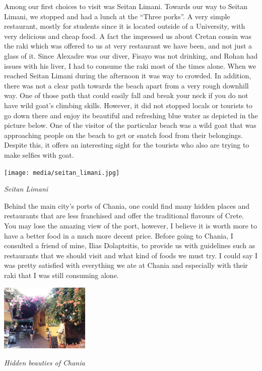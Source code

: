 \documentclass[10pt,a4paper]{article} %
\begin{document}
\begin{multicols}{3}
Among our first choices to visit was Seitan Limani. 
Towards our way to Seitan Limani, we stopped and had a lunch at the 
``Three porks''. 
A very simple restaurant, mostly for students since it is located outside 
of a University, with very delicious and cheap food. 
A fact the impressed us about Cretan cousin was the raki which was offered to us 
at very restaurant we have been, and not just a glass of it. 
Since Alexadre was our diver, Fisayo was not drinking, and Rohan had issues with his 
liver, I had to consume the raki most of the times alone. 
When we reached Seitan Limani during the afternoon it was way to crowded. 
In addition, there was not a clear path towards the beach apart from a very 
rough downhill way. 
One of those path that could easily fall and break your neck if you do not have 
wild goat's climbing skills. 
However, it did not stopped locals or tourists to go down there and enjoy its 
beautiful and refreshing blue water as depicted in the picture below. 
One of the visitor of the particular beach was a wild goat that was approaching 
people on the beach to get or snatch food from their belongings. 
Despite this, it offers an interesting sight for the tourists who also are trying 
to make selfies with goat.   

 
\begin{center}
	\texttt{[image: media/seitan\_limani.jpg]}
	\par\textit{Seitan Limani}
\end{center}



Behind the main city's ports of Chania, one could find many hidden places and 
restaurants that are less franchised and offer the traditional flavours of 
Crete. 
You may lose the amazing view of the port, however, I believe it is worth more 
to have a better food in a much more decent price. 
Before going to Chania, I consulted a friend of mine, Ilias Dolaptsitis, 
to provide us with guidelines such as restaurants that we should visit and what 
kind of foods we must try. 
I could say I was pretty satisfied with everything we ate at Chania and especially 
with their raki that I was still consuming alone. 


\begin{center}
	\includegraphics[width=0.32\textwidth]{media/chania_2.jpg}
	\par\textit{Hidden beauties of Chania}
\end{center}



\end{multicols}
\end{document}

